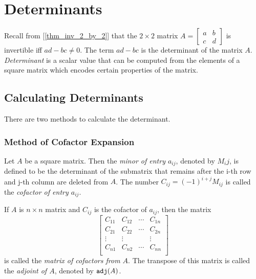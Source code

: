 \documentclass{report}
\begin{document}
	\section{Determinants}
		Recall from [\ref{thm_inv_2_by_2}] that the $2 \times 2$ matrix $A=\begin{bmatrix} a & b \\ c & d \end{bmatrix}$ is invertible iff $ad-bc \ne 0$. The term $ad-bc$ is the determinant of the matrix $A$. \emph{Determinant} is a scalar value that can be computed from the elements of a square matrix which encodes certain properties of the matrix.
		\subsection{Calculating Determinants}
			There are two methods to calculate the determinant.
			\subsubsection{Method of Cofactor Expansion}
				\begin{defn}
					Let $A$ be a square matrix. Then the \emph{minor of entry $a_{ij}$}, denoted by $M_ij$, is defined to be the determinant of the submatrix that remains after the i-th row and j-th column are deleted from $A$. The number $C_{ij}=(-1)^{i+j}M_{ij}$ is called the \emph{cofactor of entry $a_{ij}$}.
				\end{defn}
				
				\begin{defn}[Adjoint]
					If $A$ is $n \times n$ matrix and $C_{ij}$ is the cofactor of $a_{ij}$, then the matrix
					\begin{displaymath}
					\begin{bmatrix}
						C_{11} & C_{12} & \cdots & C_{1n} \\
						C_{21} & C_{22} & \cdots & C_{2n} \\
						\vdots & \vdots &        & \vdots \\
						C_{n1} & C_{n2} & \cdots & C_{nn} \\
					\end{bmatrix}
					\end{displaymath}
					is called the \emph{matrix of cofactors from $A$}. The transpose of this matrix is called the \emph{adjoint of $A$}, denoted by $\verb|adj|(A)$.
				\end{defn}
				
\end{document}
